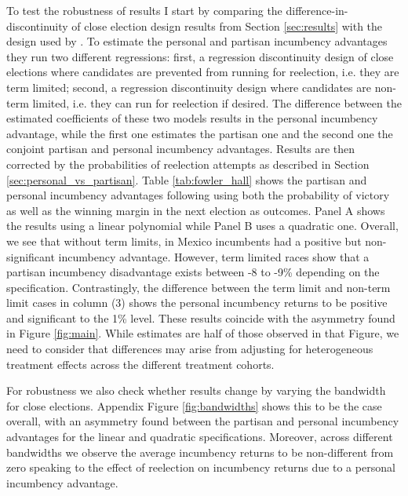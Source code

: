 \documentclass[12pt]{amsart}
\numberwithin{equation}{section}
\theoremstyle{definition}
\theoremstyle{definition}
\theoremstyle{definition}
\begin{document}
To test the robustness of results I start by comparing the difference-in-discontinuity of close election design results from Section \ref{sec:results} with the design used by \citet{fowler_hall_2014}. To estimate the personal and partisan incumbency advantages they run two different regressions: first, a regression discontinuity design of close elections where candidates are prevented from running for reelection, i.e. they are term limited; second, a regression discontinuity design where candidates are non-term limited, i.e. they can run for reelection if desired. The difference between the estimated coefficients of these two models results in the personal incumbency advantage, while the first one estimates the partisan one and the second one the conjoint partisan and personal incumbency advantages. Results are then corrected by the probabilities of reelection attempts as described in Section \ref{sec:personal_vs_partisan}. Table \ref{tab:fowler_hall} shows the partisan and personal incumbency advantages following \citet{fowler_hall_2014} using both the probability of victory as well as the winning margin in the next election as outcomes. Panel A shows the results using a linear polynomial while Panel B uses a quadratic one. Overall, we see that without term limits, in Mexico incumbents had a positive but non-significant incumbency advantage. However, term limited races show that a partisan incumbency disadvantage exists between -8 to -9\% depending on the specification. Contrastingly, the difference between the term limit and non-term limit cases in column (3) shows the personal incumbency returns to be positive and significant to the 1\% level. These results coincide with the asymmetry found in Figure \ref{fig:main}. While estimates are half of those observed in that Figure, we need to consider that differences may arise from adjusting for heterogeneous treatment effects across the different treatment cohorts. 

For robustness we also check whether results change by varying the bandwidth for close elections. Appendix Figure \ref{fig:bandwidths} shows this to be the case overall, with an asymmetry found between the partisan and personal incumbency advantages for the linear and quadratic specifications. Moreover, across different bandwidths we observe the average incumbency returns to be non-different from zero speaking to the effect of reelection on incumbency returns due to a personal incumbency advantage. 
      
   
\end{document}

